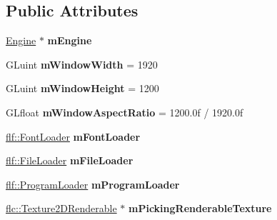 \subsection*{Public Attributes}
\begin{DoxyCompactItemize}
\item 
\mbox{\label{structflw_1_1Engine_1_1EngineImpl_a9c64f8ee7c6ac8835080287ed3367c3f}} 
\hyperlink{classflw_1_1Engine}{Engine} $\ast$ {\bfseries m\+Engine}
\item 
\mbox{\label{structflw_1_1Engine_1_1EngineImpl_aef610baed5ac54f136ecfdc97e1683aa}} 
G\+Luint {\bfseries m\+Window\+Width} = 1920
\item 
\mbox{\label{structflw_1_1Engine_1_1EngineImpl_a9e20cc9b2d108f04c78fbc4471871e70}} 
G\+Luint {\bfseries m\+Window\+Height} = 1200
\item 
\mbox{\label{structflw_1_1Engine_1_1EngineImpl_a46ed363e1a45b86fb9390037b7fc70a6}} 
G\+Lfloat {\bfseries m\+Window\+Aspect\+Ratio} = 1200.\+0f / 1920.\+0f
\item 
\mbox{\label{structflw_1_1Engine_1_1EngineImpl_aa2518f4952d54afbc00d0c929ffd415c}} 
\hyperlink{classflw_1_1flf_1_1FontLoader}{flf\+::\+Font\+Loader} {\bfseries m\+Font\+Loader}
\item 
\mbox{\label{structflw_1_1Engine_1_1EngineImpl_afb036e6ebe80cb31685cef3755f400ce}} 
\hyperlink{classflw_1_1flf_1_1FileLoader}{flf\+::\+File\+Loader} {\bfseries m\+File\+Loader}
\item 
\mbox{\label{structflw_1_1Engine_1_1EngineImpl_a6d3acddc158c0d8d4a6a62539a1ebcdd}} 
\hyperlink{classflw_1_1flf_1_1ProgramLoader}{flf\+::\+Program\+Loader} {\bfseries m\+Program\+Loader}
\item 
\mbox{\label{structflw_1_1Engine_1_1EngineImpl_aa55b1ccd3c1ab1b2b84eee7c481a9f8d}} 
\hyperlink{classflw_1_1flc_1_1Texture2DRenderable}{flc\+::\+Texture2\+D\+Renderable} $\ast$ {\bfseries m\+Picking\+Renderable\+Texture}

\end{DoxyCompactItemize}
